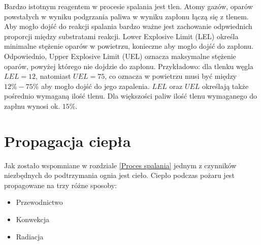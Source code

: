 Bardzo istotnym reagentem w procesie spalania jest tlen. Atomy gazów, oparów powstałych w wyniku podgrzania paliwa w wyniku zapłonu łączą się z tlenem.
Aby mogło dojść do reakcji spalania bardzo ważne jest zachowanie odpwiednich proporcji między substratami reakcji. Lower Explosive Limit (LEL) określa 
minimalne stężenie oparów w powietrzu, konieczne aby mogło dojść do zapłonu. Odpowiednio, Upper Explosive Limit (UEL) oznacza maksymalne stężenie oparów, powyżej
którego nie dojdzie do zapłonu. Przykładowo: dla tlenku węgla $LEL=12$, natomiast  $UEL=75$, co oznacza w powietrzu musi być między $12\%-75\%$ aby mogło dojść
do jego zapalenia. $LEL$ oraz $UEL$ określają także pośrednio wymaganą ilość tlenu. Dla większości paliw ilość tlenu wymaganego do zapłnu wynosi ok. $15\%$. 

\section {Propagacja ciepła}
Jak zostało wspomniane w rozdziale \ref{Proces spalania} jednym z czynników niezbędnych
do podtrzymania ognia jest cieło. Ciepło podczas pożaru jest propagowane na trzy różne sposoby:
\begin {itemize}
\item Przewodnictwo
\item Konwekcja
\item Radiacja
\end {itemize}

